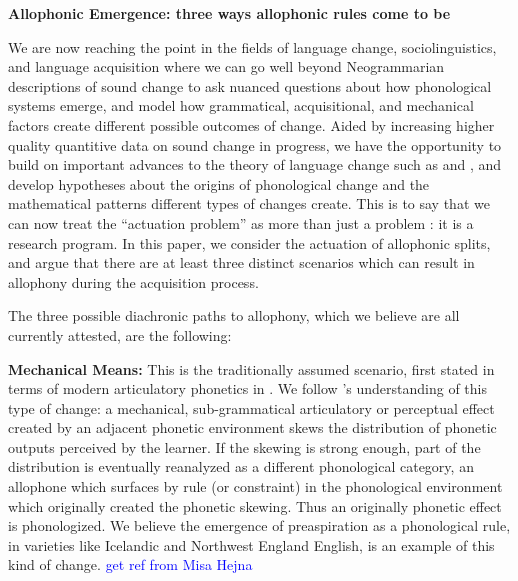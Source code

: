 \documentclass[a4paper,aps,prl,12pt,tightenlines,superscriptaddress]{revtex4}
\title{}
\begin{document}
\begin{center} \textbf{Allophonic Emergence: three ways allophonic rules come to be} 
 \end{center}



We are now reaching the point in the fields of language change, sociolinguistics, and language acquisition where we can go well beyond Neogrammarian descriptions of sound change to ask nuanced questions about how phonological systems emerge, and model how grammatical, acquisitional, and mechanical factors create different possible outcomes of change. Aided by increasing higher quality quantitive data on sound change in progress, we have the opportunity to build on important advances to the theory of language change such as \citet{kiparsky1995b} and \citet{labov1994}, and develop hypotheses about the origins of phonological change and the mathematical patterns different types of changes create. This is to say that we can now treat the ``actuation problem'' as more than just a problem \citep{wlh1968}: it is a research program. In this paper, we consider the actuation of allophonic splits, and argue that there are at least three distinct scenarios which can result in allophony during the acquisition process.

The three possible diachronic paths to allophony, which we believe are all currently attested, are the following:

\textbf{Mechanical Means:} This is the traditionally assumed scenario, first stated in terms of modern articulatory phonetics in \citet{ohala1983, ohala1989}. We follow \citet[][and previous work]{bermudezotero2014}'s understanding of this type of change: a mechanical, sub-grammatical articulatory or perceptual effect created by an adjacent phonetic environment skews the distribution of phonetic outputs perceived by the learner. If the skewing is strong enough, part of the distribution is eventually reanalyzed as a different phonological category, an allophone which surfaces by rule (or constraint) in the phonological environment which originally created the phonetic skewing. Thus an originally phonetic effect is phonologized. We believe the emergence of preaspiration as a phonological rule, in varieties like Icelandic and Northwest England English, is an example of this kind of change. \textcolor{blue}{get ref from Misa Hejna}
\end{document}
